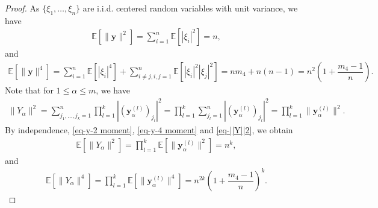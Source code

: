 \documentclass[10pt,a4paper]{amsart}
\def\bE{\mathbb E}
\def\y{\mathbf y}
\begin{document}
\begin{proof}
As $\{\xi_1,\ldots,\xi_n\}$ are i.i.d. centered random variables with unit variance, we have
\begin{align} \label{eq-y-2 moment}
    \bE \left[ \|\y\|^2 \right]
    = \sum_{i=1}^n \bE \left[ |\xi_i|^2 \right]
    = n,
\end{align}
and
\begin{align} \label{eq-y-4 moment}
    \bE \left[ \|\y\|^4 \right]
    = \sum_{i=1}^n \bE \left[ |\xi_i|^4 \right] + \sum_{i\not=j,i,j=1}^n \bE \left[ |\xi_i|^2 |\xi_j|^2 \right]
    = n m_4 + n(n-1)
    = n^2 \left( 1 + \dfrac{m_4-1}{n} \right).
\end{align}
Note that for $1 \le \alpha \le m$, we have
\begin{align} \label{eq-||Y||2}
    \|Y_\alpha\|^2
    = \sum_{j_1,\ldots,j_k=1}^n \prod_{l=1}^k \left| \left( \y_\alpha^{(l)} \right)_{j_l} \right|^2
    = \prod_{l=1}^k \sum_{j_l=1}^n \left| \left( \y_\alpha^{(l)} \right)_{j_l} \right|^2
    = \prod_{l=1}^k \| \y_\alpha^{(l)} \|^2.
\end{align}
By independence, \eqref{eq-y-2 moment}, \eqref{eq-y-4 moment} and \eqref{eq-||Y||2}, we obtain
\begin{align*}
    \bE \left[ \|Y_\alpha\|^2 \right]
    = \prod_{l=1}^k \bE \left[ \| \y_\alpha^{(l)} \|^2 \right]
    = n^k,
\end{align*}
and
\begin{align*}
    \bE \left[ \|Y_\alpha\|^4 \right]
    = \prod_{l=1}^k \bE \left[ \| \y_\alpha^{(l)} \|^4 \right]
    = n^{2k} \left( 1 + \dfrac{m_4-1}{n} \right)^k.
\end{align*}
\end{proof}
\end{document}
